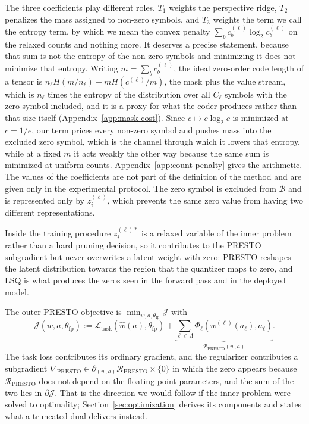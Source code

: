 \documentclass{article}
\begin{document}
The three coefficients play different roles. $T_1$ weights the perspective ridge,
$T_2$ penalizes the mass assigned to non-zero symbols, and $T_3$ weights the term
we call the entropy term, by which we mean the convex penalty
$\sum_b c_b^{(\ell)}\log_2 c_b^{(\ell)}$ on the relaxed counts and nothing more.
It deserves a precise statement, because that sum is not the entropy of the
non-zero symbols and minimizing it does not minimize that entropy. Writing
$m=\sum_b c_b^{(\ell)}$, the ideal zero-order code length of a tensor is
$n_\ell H(m/n_\ell)+mH(c^{(\ell)}/m)$, the mask plus the value stream, which is
$n_\ell$ times the entropy of the distribution over all $C_\ell$ symbols with the
zero symbol included, and it is a proxy for what the coder produces rather than
that size itself (Appendix~\ref{app:mask-cost}). Since $c\mapsto c\log_2c$ is minimized at $c=1/e$,
our term prices every non-zero symbol and pushes mass into the excluded zero
symbol, which is the channel through which it lowers that entropy, while at a
fixed $m$ it acts weakly the other way because the same sum is minimized at
uniform counts. Appendix~\ref{app:count-penalty} gives the arithmetic.
The values of the coefficients are not part of the definition of
the method and are given only in the experimental protocol. The zero symbol is excluded from $\mathcal B$ and is
represented only by $z_i^{(\ell)}$, which prevents the same zero value from
having two different representations.

Inside the training procedure $z_i^{(\ell)*}$ is a relaxed variable of the inner
problem rather than a hard pruning decision, so it contributes to the PRESTO
subgradient but never overwrites a latent weight with zero: PRESTO reshapes the
latent distribution towards the region that the quantizer maps to zero, and LSQ
is what produces the zeros seen in the forward pass and in the deployed model.

The outer PRESTO objective is
$\min_{w,a,\theta_{\mathrm{fp}}}\mathcal J$ with
\begin{equation}
  \mathcal J(w,a,\theta_{\mathrm{fp}})
  :=
  \mathcal L_{\mathrm{task}}\!\left(\widehat w(a),\theta_{\mathrm{fp}}\right)
  +\underbrace{\sum_{\ell\in\Lambda}
   \Phi_\ell\!\left(\bar w^{(\ell)}(a_\ell),a_\ell\right)}
   _{\textstyle \mathcal R_{\mathrm{PRESTO}}(w,a)}.
  \label{eq:outer-objective}
\end{equation}
The task loss contributes its ordinary gradient, and the regularizer contributes a
subgradient
$\nabla_{\mathrm{PRESTO}}\in\partial_{(w,a)}\mathcal R_{\mathrm{PRESTO}}\times\{0\}$
in which the zero appears because $\mathcal R_{\mathrm{PRESTO}}$ does not depend
on the floating-point parameters, and the sum of the two lies in
$\partial\mathcal J$. That is the direction we would follow if the inner problem
were solved to optimality; Section~\ref{sec:optimization} derives its components
and states what a truncated dual delivers instead.
\end{document}
